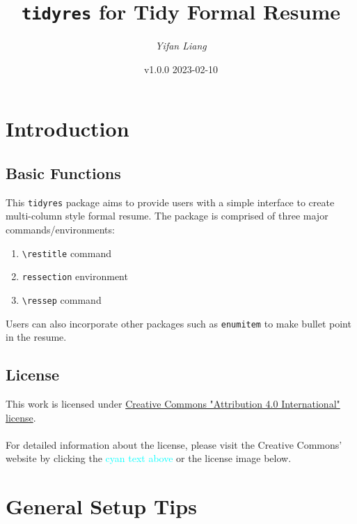 \documentclass[a4paper,10pt]{article}
\title{{\tt tidyres} for Tidy Formal Resume}
\author{\itshape Yifan Liang}
\date{v1.0.0 2023-02-10}
\begin{document}
\maketitle
\tableofcontents
\thispagestyle{empty}

\newpage
\setcounter{page}{1}
\pagestyle{plain}

\section{Introduction}
\subsection{Basic Functions}
This {\tt tidyres} package aims to provide users with a simple interface to create multi-column style formal resume. The package is comprised of three major commands/environments:

\begin{enumerate}[label=\textbullet,leftmargin=6ex,topsep=4ex]
    \item \verb+\restitle+ command
    \item \verb+ressection+ environment
    \item \verb+\ressep+ command
\end{enumerate}

Users can also incorporate other packages such as \verb+enumitem+ to make bullet point in the resume.

\vspace{1cm}

\subsection{License}
This work is licensed under \href{https://creativecommons.org/licenses/by/4.0/}{Creative Commons "Attribution 4.0 International" license}.\\
\\
For detailed information about the license, please visit the Creative Commons' website by clicking the \textcolor{Cyan}{cyan text above} or the license image below.
\\
\begin{flushright}
    \doclicenseImage
\end{flushright}

\newpage

\section{General Setup Tips}
\end{document}
